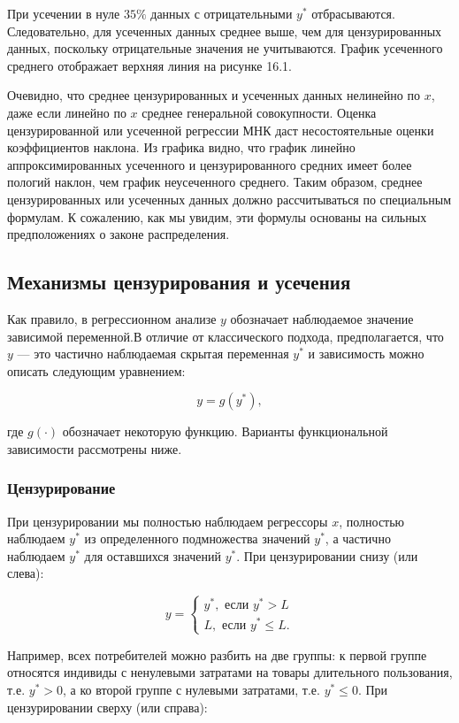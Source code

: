 При усечении в нуле $35\%$ данных с отрицательными $y^*$ отбрасываются. Следовательно, для усеченных данных среднее выше, чем для цензурированных данных, поскольку отрицательные значения не учитываются. График усеченного среднего отображает верхняя линия на рисунке 16.1.

Очевидно, что среднее цензурированных и усеченных данных нелинейно по $x$, даже если линейно по $x$ среднее генеральной совокупности. Оценка цензурированной или усеченной регрессии МНК даст несостоятельные оценки коэффициентов наклона. Из графика видно, что график линейно аппроксимированных усеченного и цензурированного средних имеет более пологий наклон, чем график неусеченного среднего. Таким образом, среднее цензурированных или усеченных данных должно рассчитываться по специальным формулам. К сожалению, как мы увидим, эти формулы основаны на сильных предположениях о законе распределения.

\subsection{Механизмы цензурирования и усечения}

Как правило, в регрессионном анализе $y$ обозначает наблюдаемое значение зависимой переменной.В отличие от классического подхода, предполагается, что $y$ --- это частично наблюдаемая скрытая переменная $y^* $ и зависимость можно описать следующим уравнением:

\[
y=g(y^* ),
\]

где $g(\cdot )$ обозначает некоторую функцию. Варианты функциональной зависимости рассмотрены ниже. 


\subsubsection*{Цензурирование}


При цензурировании мы полностью наблюдаем регрессоры $x$, полностью наблюдаем $y^* $ из определенного подмножества значений $y^*$, а частично наблюдаем $y^*$ для оставшихся значений $y^*$. При цензурировании снизу (или слева):

\begin{equation}
y=
\begin{cases}
y^* , \text{ если } y^* >L\\
L, \text{ если }y^*  \leq L.
\end{cases}
\end{equation}

Например, всех потребителей можно разбить на две группы: к первой группе относятся индивиды с ненулевыми затратами на товары длительного пользования, т.е. $y^* >0$, а ко второй группе с нулевыми затратами, т.е. $y^*  \leq 0$. При цензурировании сверху (или справа):

